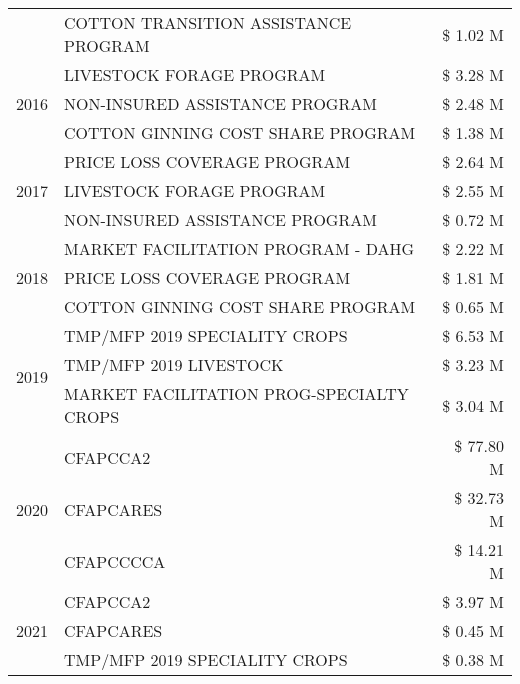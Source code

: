 \begin{tabular}{llr}
 & COTTON TRANSITION ASSISTANCE PROGRAM & \$ 1.02 M \\
\cline{1-3}
\multirow[t]{3}{*}{2016} & LIVESTOCK FORAGE PROGRAM                      & \$ 3.28 M \\
 & NON-INSURED ASSISTANCE PROGRAM                & \$ 2.48 M \\
 & COTTON GINNING COST SHARE PROGRAM             & \$ 1.38 M \\
\cline{1-3}
\multirow[t]{3}{*}{2017} & PRICE LOSS COVERAGE PROGRAM & \$ 2.64 M \\
 & LIVESTOCK FORAGE PROGRAM & \$ 2.55 M \\
 & NON-INSURED ASSISTANCE PROGRAM & \$ 0.72 M \\
\cline{1-3}
\multirow[t]{3}{*}{2018} & MARKET FACILITATION PROGRAM - DAHG & \$ 2.22 M \\
 & PRICE LOSS COVERAGE PROGRAM & \$ 1.81 M \\
 & COTTON GINNING COST SHARE PROGRAM & \$ 0.65 M \\
\cline{1-3}
\multirow[t]{3}{*}{2019} & TMP/MFP 2019 SPECIALITY CROPS & \$ 6.53 M \\
 & TMP/MFP 2019 LIVESTOCK & \$ 3.23 M \\
 & MARKET FACILITATION PROG-SPECIALTY CROPS & \$ 3.04 M \\
\cline{1-3}
\multirow[t]{3}{*}{2020} & CFAPCCA2 & \$ 77.80 M \\
 & CFAPCARES & \$ 32.73 M \\
 & CFAPCCCCA & \$ 14.21 M \\
\cline{1-3}
\multirow[t]{3}{*}{2021} & CFAPCCA2 & \$ 3.97 M \\
 & CFAPCARES & \$ 0.45 M \\
 & TMP/MFP 2019 SPECIALITY CROPS & \$ 0.38 M \\
\cline{1-3}
\bottomrule
\end{tabular}
